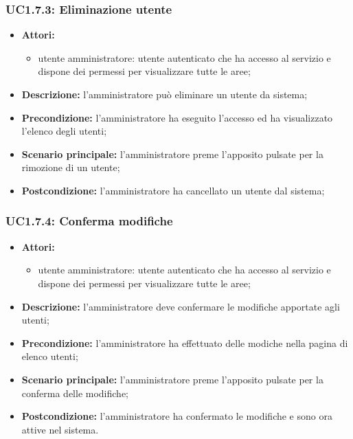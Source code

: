 \subsubsection{UC1.7.3: Eliminazione utente}
\begin{itemize}
	\item \textbf{Attori:}
	\begin{itemize}
		\item utente amministratore: utente autenticato che ha accesso al servizio e dispone dei permessi per visualizzare tutte le aree;
	\end{itemize}
	\item \textbf{Descrizione:} l'amministratore può eliminare un utente da sistema;
	\item \textbf{Precondizione:} l'amministratore ha eseguito l'accesso ed ha visualizzato l'elenco degli utenti;
	\item \textbf{Scenario principale:} l'amministratore preme l'apposito pulsate per la rimozione di un utente;
	\item \textbf{Postcondizione:} l'amministratore ha cancellato un utente dal sistema;
\end{itemize}

\subsubsection{UC1.7.4: Conferma modifiche}
\begin{itemize}
	\item \textbf{Attori:}
	\begin{itemize}
		\item utente amministratore: utente autenticato che ha accesso al servizio e dispone dei permessi per visualizzare tutte le aree;
	\end{itemize}
	\item \textbf{Descrizione:} l'amministratore deve confermare le modifiche apportate agli utenti;
	\item \textbf{Precondizione:} l'amministratore ha effettuato delle modiche nella pagina di elenco utenti;
	\item \textbf{Scenario principale:} l'amministratore preme l'apposito pulsate per la conferma delle modifiche;
	\item \textbf{Postcondizione:} l'amministratore ha confermato le modifiche e sono ora attive nel sistema.
\end{itemize}

